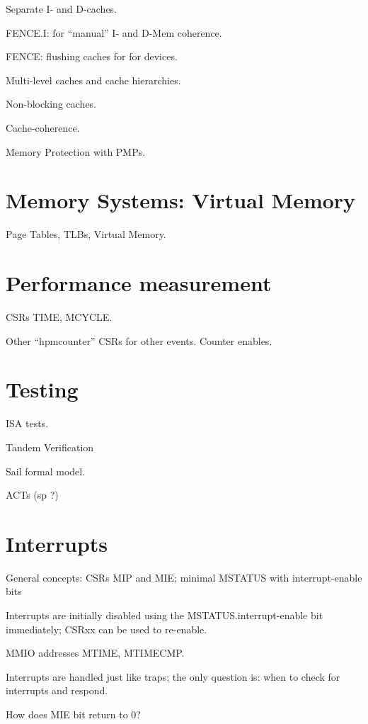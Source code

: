 Separate I- and D-caches.

FENCE.I: for ``manual'' I- and D-Mem coherence.

FENCE: flushing caches for for devices.

Multi-level caches and cache hierarchies.

Non-blocking caches.

Cache-coherence.

Memory Protection with PMPs.


\section{Memory Systems: Virtual Memory}

Page Tables, TLBs, Virtual Memory.


\section{Performance measurement}

CSRs TIME, MCYCLE.

Other ``hpmcounter'' CSRs for other events.
Counter enables.


\section{Testing}

ISA tests. 

Tandem Verification

Sail formal model.

ACTs (sp ?)


\section{Interrupts}

\begin{tightlist}
  \item General concepts: CSRs MIP and MIE; minimal MSTATUS with interrupt-enable bits

  \item Interrupts are initially disabled using the
        MSTATUS.interrupt-enable bit immediately; CSRxx can be used to
        re-enable.

  \item MMIO addresses MTIME, MTIMECMP.

  \item Interrupts are handled just like traps; the only question is:
        when to check for interrupts and respond.

  \item How does MIE bit return to 0?

\end{tightlist}

